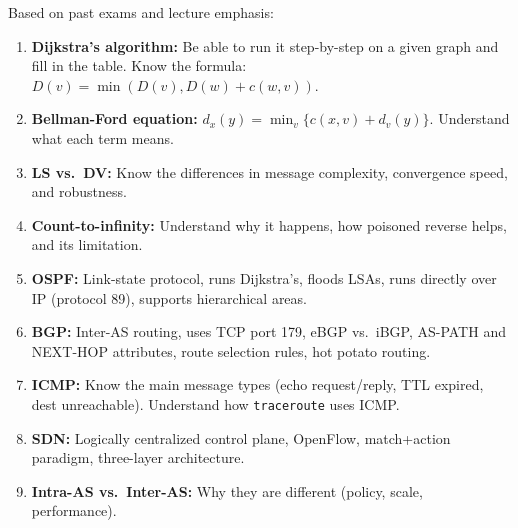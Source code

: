 \begin{exambox}
Based on past exams and lecture emphasis:

\begin{enumerate}[noitemsep]
    \item \textbf{Dijkstra's algorithm:} Be able to run it step-by-step on a given graph and fill in the table. Know the formula: $D(v) = \min(D(v), D(w) + c(w,v))$.
    \item \textbf{Bellman-Ford equation:} $d_x(y) = \min_v \{c(x,v) + d_v(y)\}$. Understand what each term means.
    \item \textbf{LS vs.\ DV:} Know the differences in message complexity, convergence speed, and robustness.
    \item \textbf{Count-to-infinity:} Understand why it happens, how poisoned reverse helps, and its limitation.
    \item \textbf{OSPF:} Link-state protocol, runs Dijkstra's, floods LSAs, runs directly over IP (protocol 89), supports hierarchical areas.
    \item \textbf{BGP:} Inter-AS routing, uses TCP port 179, eBGP vs.\ iBGP, AS-PATH and NEXT-HOP attributes, route selection rules, hot potato routing.
    \item \textbf{ICMP:} Know the main message types (echo request/reply, TTL expired, dest unreachable). Understand how \texttt{traceroute} uses ICMP.
    \item \textbf{SDN:} Logically centralized control plane, OpenFlow, match+action paradigm, three-layer architecture.
    \item \textbf{Intra-AS vs.\ Inter-AS:} Why they are different (policy, scale, performance).
\end{enumerate}
\end{exambox}

